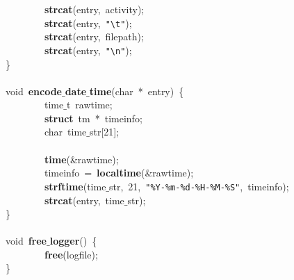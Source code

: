 \mbox{}\ \ \ \ \ \ \ \ \textbf{strcat}(entry,\ activity); \\
\mbox{}\ \ \ \ \ \ \ \ \textbf{strcat}(entry,\ \texttt{"{}}\texttt{\textbackslash{}t}\texttt{"{}}); \\
\mbox{}\ \ \ \ \ \ \ \ \textbf{strcat}(entry,\ filepath); \\
\mbox{}\ \ \ \ \ \ \ \ \textbf{strcat}(entry,\ \texttt{"{}}\texttt{\textbackslash{}n}\texttt{"{}}); \\
\mbox{}\} \\
\mbox{} \\
\mbox{}void\ \textbf{encode$\_$date$\_$time}(char\ *\ entry)\ \{ \\
\mbox{}\ \ \ \ \ \ \ \ time$\_$t\ rawtime; \\
\mbox{}\ \ \ \ \ \ \ \ \textbf{struct}\ tm\ *\ timeinfo; \\
\mbox{}\ \ \ \ \ \ \ \ char\ time$\_$str[21]; \\
\mbox{}\ \ \ \ \ \ \ \  \\
\mbox{}\ \ \ \ \ \ \ \ \textbf{time}(\&rawtime); \\
\mbox{}\ \ \ \ \ \ \ \ timeinfo\ =\ \textbf{localtime}(\&rawtime); \\
\mbox{}\ \ \ \ \ \ \ \ \textbf{strftime}(time$\_$str,\ 21,\ \texttt{"{}\%Y-\%m-\%d-\%H-\%M-\%S"{}},\ timeinfo); \\
\mbox{}\ \ \ \ \ \ \ \ \textbf{strcat}(entry,\ time$\_$str); \\
\mbox{}\} \\
\mbox{} \\
\mbox{}void\ \textbf{free$\_$logger}()\ \{ \\
\mbox{}\ \ \ \ \ \ \ \ \textbf{free}(logfile); \\
\mbox{}\} \\

\clearpage
\normalsize
\rmfamily
